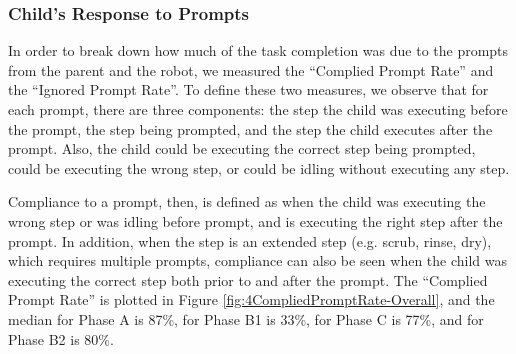 \documentclass{ut-thesis}
\begin{document}
\subsubsection{Child's Response to Prompts}
In order to break down how much of the task completion was due to the prompts from the parent and the robot, we measured the ``Complied Prompt Rate'' and the ``Ignored Prompt Rate''.  To define these two measures, we observe that for each prompt, there are three components: the step the child was executing before the prompt, the step being prompted, and the step the child executes after the prompt.  Also, the child could be executing the correct step being prompted, could be executing the wrong step, or could be idling without executing any step.

Compliance to a prompt, then, is defined as when the child was executing the wrong step or was idling before prompt, and is executing the right step after the prompt.  In addition, when the step is an extended step (e.g. scrub, rinse, dry), which requires multiple prompts, compliance can also be seen when the child was executing the correct step both prior to and after the prompt.  The ``Complied Prompt Rate'' is plotted in Figure \ref{fig:4CompliedPromptRate-Overall}, and the median for Phase A is 87\%, for Phase B1 is 33\%, for Phase C is 77\%, and for Phase B2 is 80\%.
\end{document}
